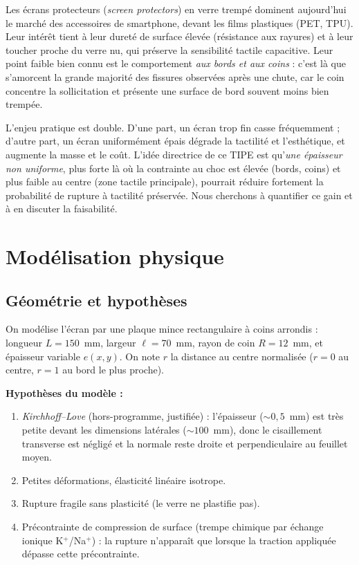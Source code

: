 \documentclass[11pt,a4paper]{article}
\begin{document}
Les écrans protecteurs (\emph{screen protectors}) en verre trempé dominent
aujourd'hui le marché des accessoires de smartphone, devant les films
plastiques (PET, TPU). Leur intérêt tient à leur dureté de surface élevée
(résistance aux rayures) et à leur toucher proche du verre nu, qui préserve la
sensibilité tactile capacitive. Leur point faible bien connu est le
comportement \emph{aux bords et aux coins} : c'est là que s'amorcent la grande
majorité des fissures observées après une chute, car le coin concentre la
sollicitation et présente une surface de bord souvent moins bien trempée.

\medskip
L'enjeu pratique est double. D'une part, un écran trop fin casse fréquemment ;
d'autre part, un écran uniformément épais dégrade la tactilité et l'esthétique,
et augmente la masse et le coût. L'idée directrice de ce TIPE est qu'\emph{une
épaisseur non uniforme}, plus forte là où la contrainte au choc est élevée
(bords, coins) et plus faible au centre (zone tactile principale), pourrait
réduire fortement la probabilité de rupture à tactilité préservée. Nous
cherchons à quantifier ce gain et à en discuter la faisabilité.

\section{Modélisation physique}

\subsection{Géométrie et hypothèses}

On modélise l'écran par une plaque mince rectangulaire à coins arrondis :
longueur $L = 150$~mm, largeur $\ell = 70$~mm, rayon de coin $R = 12$~mm, et
épaisseur variable $e(x,y)$. On note $r$ la distance au centre normalisée
($r=0$ au centre, $r=1$ au bord le plus proche).

\medskip\noindent\textbf{Hypothèses du modèle :}
\begin{enumerate}[leftmargin=2em,itemsep=1pt]
  \item \emph{Kirchhoff--Love} (hors-programme, justifiée) : l'épaisseur
        ($\sim 0{,}5$~mm) est très petite devant les dimensions latérales
        ($\sim 100$~mm), donc le cisaillement transverse est négligé et la
        normale reste droite et perpendiculaire au feuillet moyen.
  \item Petites déformations, élasticité linéaire isotrope.
  \item Rupture fragile sans plasticité (le verre ne plastifie pas).
  \item Précontrainte de compression de surface (trempe chimique par échange
        ionique \mbox{K$^+$/Na$^+$}) : la rupture n'apparaît que lorsque la
        traction appliquée dépasse cette précontrainte.
\end{enumerate}
\end{document}
